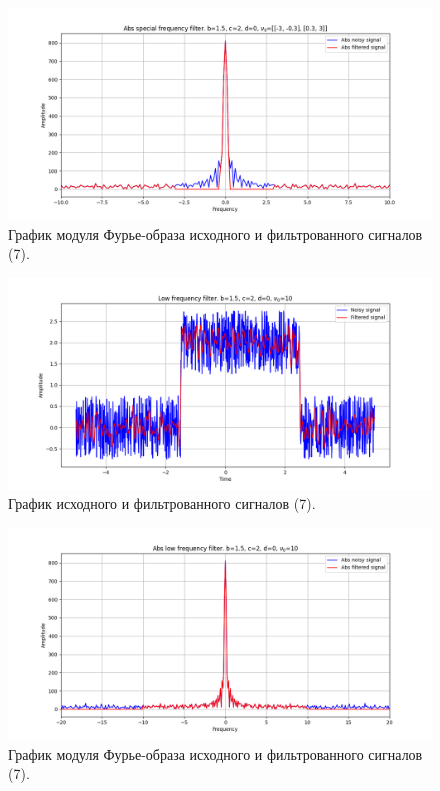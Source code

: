 \documentclass[a4paper, 12pt]{article}
\begin{document}
    \begin{figure}[H]
        \centering
        \includegraphics[scale=0.48]{7_abs_u_U_nospec.png}
        \captionsetup{skip=0pt}
        \caption{График модуля Фурье-образа исходного и фильтрованного сигналов (7).}
        \label{fig:dfsjusdf}
    \end{figure}
    \begin{figure}[!htb]
        \centering
        \includegraphics[scale=0.48]{7_1_u_flt_u_nospec.png}
        \captionsetup{skip=0pt}
        \caption{График исходного и фильтрованного сигналов (7).}
        \label{fig:ufhuwf}
    \end{figure}
    \begin{figure}[!htb]
        \centering
        \includegraphics[scale=0.48]{7_1_abs_u_U_nospec.png}
        \captionsetup{skip=0pt}
        \caption{График модуля Фурье-образа исходного и фильтрованного сигналов (7).}
        \label{fig:kfndgdfgni}
    \end{figure}
\end{document}
